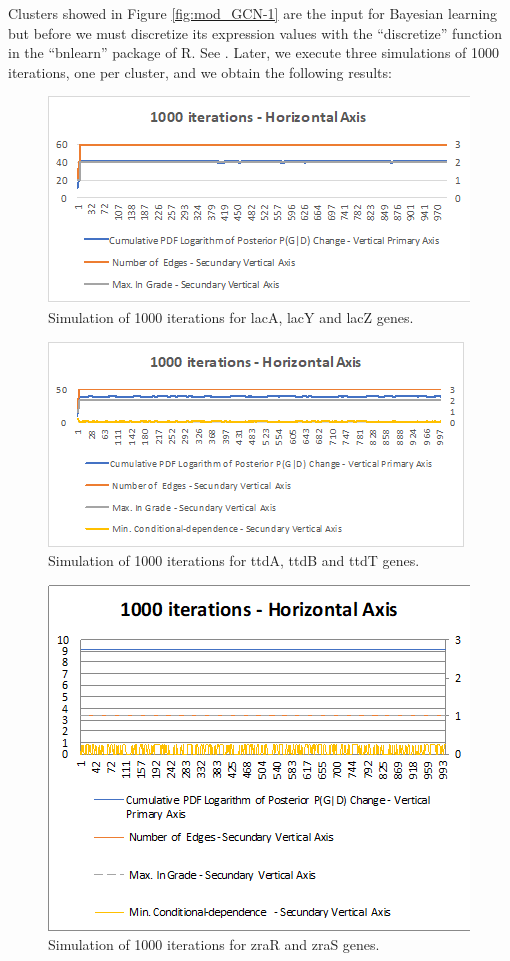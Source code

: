 \documentclass{bmcart}
\begin{document}
Clusters showed in Figure \ref{fig:mod_GCN-1} are the input for Bayesian learning but before we must discretize its expression values with the \textquotedblleft discretize\textquotedblright{} function in the \textquotedblleft bnlearn\textquotedblright{} package of R. See \cite{Nagarajan:2013:BNR:2487420}. Later, we execute three simulations of 1000 iterations, one per cluster, and we obtain the following results:
\begin{figure}
\includegraphics[scale=2.5]{images/sim1000-lac_Ecoli} \centering
\caption{Simulation of 1000 iterations for lacA, lacY and lacZ genes.}
\label{fig:sim_lac-1} 
\end{figure}
\begin{figure}
\includegraphics[scale=2.5]{images/sim1000-ttd_Ecoli} \centering
\caption{Simulation of 1000 iterations for ttdA, ttdB and ttdT genes.}
\label{fig:sim_ttd-2} 
\end{figure}
\begin{figure}
\includegraphics[scale=2.5]{images/sim1000-zra_Ecoli} \centering
\caption{Simulation of 1000 iterations for zraR and zraS genes.}
\label{fig:sim_zra-3} 
\end{figure}
\end{document}
